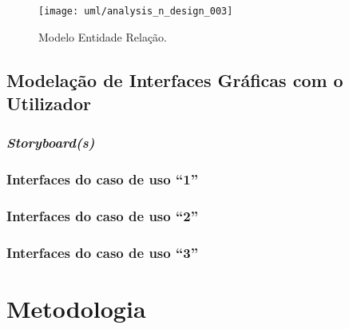 \documentclass[12pt,a4paper,openright,oneside]{memoir}
\begin{document}
\begin{figure}[H]
  \centering
  \texttt{[image: uml/analysis\_n\_design\_003]}
  \caption{Modelo Entidade Relação.}
  \label{fig:er_diagram}
\end{figure}

\subsection{Modelação de Interfaces Gráficas com o Utilizador}


\subsubsection{\textit{Storyboard(s)}}
\subsubsection{Interfaces do caso de uso “1”}
\subsubsection{Interfaces do caso de uso “2”}
\subsubsection{Interfaces do caso de uso “3”}

\section{Metodologia}
\end{document}
